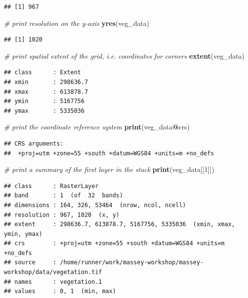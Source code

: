 \documentclass[
  12pt,
]{book}
\newenvironment{Shaded}{\begin{snugshade}}{\end{snugshade}}
\newcommand{\CommentTok}[1]{\textcolor[rgb]{0.56,0.35,0.01}{\textit{#1}}}
\newcommand{\DecValTok}[1]{\textcolor[rgb]{0.00,0.00,0.81}{#1}}
\newcommand{\KeywordTok}[1]{\textcolor[rgb]{0.13,0.29,0.53}{\textbf{#1}}}
\newcommand{\NormalTok}[1]{#1}
\newcommand{\OperatorTok}[1]{\textcolor[rgb]{0.81,0.36,0.00}{\textbf{#1}}}
\begin{document}
\begin{verbatim}
## [1] 967
\end{verbatim}

\begin{Shaded}
\begin{Highlighting}[]
\CommentTok{# print resolution on the y-axis}
\KeywordTok{yres}\NormalTok{(veg_data)}
\end{Highlighting}
\end{Shaded}

\begin{verbatim}
## [1] 1020
\end{verbatim}

\begin{Shaded}
\begin{Highlighting}[]
\CommentTok{# print spatial extent of the grid, i.e. coordinates for corners}
\KeywordTok{extent}\NormalTok{(veg_data)}
\end{Highlighting}
\end{Shaded}

\begin{verbatim}
## class      : Extent 
## xmin       : 298636.7 
## xmax       : 613878.7 
## ymin       : 5167756 
## ymax       : 5335036
\end{verbatim}

\begin{Shaded}
\begin{Highlighting}[]
\CommentTok{# print the coordinate reference system}
\KeywordTok{print}\NormalTok{(veg_data}\OperatorTok{@}\NormalTok{crs)}
\end{Highlighting}
\end{Shaded}

\begin{verbatim}
## CRS arguments:
##  +proj=utm +zone=55 +south +datum=WGS84 +units=m +no_defs
\end{verbatim}

\begin{Shaded}
\begin{Highlighting}[]
\CommentTok{# print a summary of the first layer in the stack}
\KeywordTok{print}\NormalTok{(veg_data[[}\DecValTok{1}\NormalTok{]])}
\end{Highlighting}
\end{Shaded}

\begin{verbatim}
## class      : RasterLayer 
## band       : 1  (of  32  bands)
## dimensions : 164, 326, 53464  (nrow, ncol, ncell)
## resolution : 967, 1020  (x, y)
## extent     : 298636.7, 613878.7, 5167756, 5335036  (xmin, xmax, ymin, ymax)
## crs        : +proj=utm +zone=55 +south +datum=WGS84 +units=m +no_defs 
## source     : /home/runner/work/massey-workshop/massey-workshop/data/vegetation.tif 
## names      : vegetation.1 
## values     : 0, 1  (min, max)
\end{verbatim}
\end{document}
